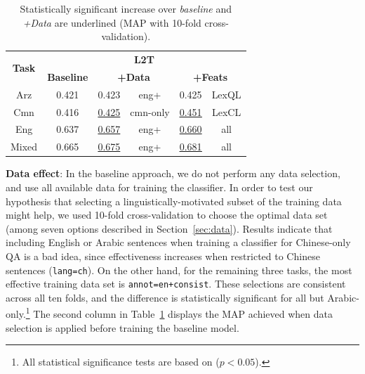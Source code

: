 \documentclass{sig-alternate-05-2015}
\newcommand{\red}[1]{\textcolor{red}{#1}}
\begin{document}
\begin{table}[h]
\begin{small}
\centering
\begin{tabular}{|c|c|c|c|c|c|}
\hline
\multirow{2}{*}{\textbf{Task}} & \multicolumn{5}{|c|}{\textbf{L2T}}  \\ \cline{2-6}
	& \textbf{Baseline} & \multicolumn{2}{c|}{\textbf{+Data}} & \multicolumn{2}{c|}{\textbf{+Feats}}  \\ \hline
Arz & 0.421 & 0.423 & eng+ & { 0.425 } & LexQL   \\ \cline{1-6}
Cmn & 0.416 & \underline{0.425} & cmn-only & \underline{\underline{ 0.451 }} & LexCL  \\ \cline{1-6}
Eng & 0.637 & \underline{0.657} & eng+ & \underline{ 0.660 } & all  \\ \hline
Mixed & 0.665 & \underline{0.675} & eng+ & \underline{\underline{ 0.681} } & all \\ \hline
\end{tabular}
\vspace{-0.1cm}
\caption{{\small Statistically significant increase over \emph{baseline} and \emph{+Data} are underlined 
(MAP with 10-fold cross-validation).}}
\vspace{-0.1cm}
\label{tab:controlled}
\end{small}

\end{table}

 

\textbf{Data effect}: In the baseline approach, we do not perform any data selection, and use all available data for training the
classifier. In order to test our hypothesis that selecting a linguistically-motivated subset of the training data
might help, we used 10-fold cross-validation to choose the optimal data set (among seven options described in 
Section~\ref{sec:data}). Results indicate that including English or Arabic sentences when training a classifier 
for Chinese-only QA is a bad idea, since effectiveness increases when restricted to Chinese sentences ({\tt lang=ch}).
On the other hand, for the remaining three tasks, the most effective training data set is {\tt annot=en+consist}.
These selections are consistent across all ten folds, and the difference is statistically significant for all but Arabic-only.\footnote{All 
statistical significance tests are based on \cite{Smucker:2007} ($p<0.05$).}
The second column in Table~\ref{tab:controlled} displays the MAP achieved when data selection is applied
before training the baseline model.
\end{document}
